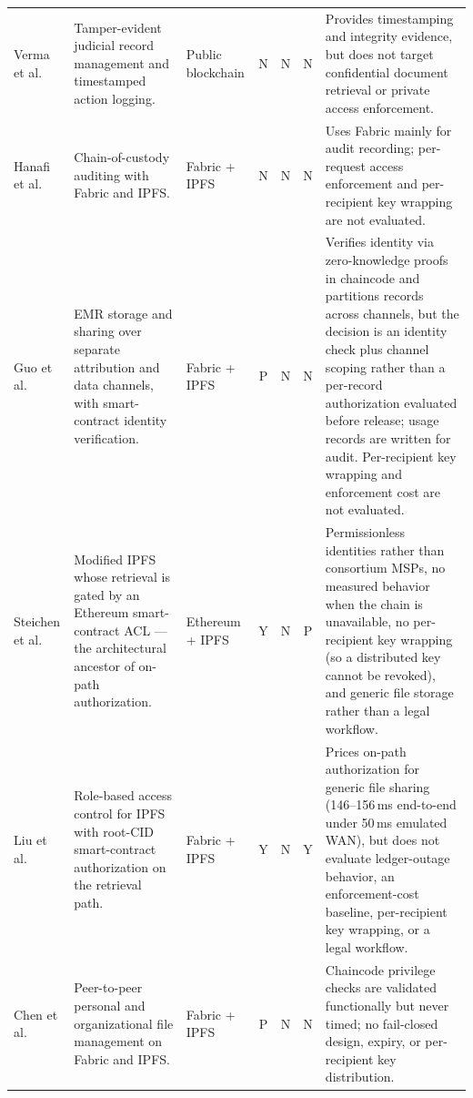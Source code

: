 \documentclass[preprint,12pt]{elsarticle}
\begin{document}
\begin{xltabular}{\textwidth}{@{}
>{\raggedright\arraybackslash}p{2.1cm}
>{\raggedright\arraybackslash}p{3.0cm}
>{\raggedright\arraybackslash}p{1.9cm}
c c c
>{\raggedright\arraybackslash}X
@{}}
Verma et al.~\cite{verma2021nyaya} &
Tamper-evident judicial record management and timestamped action logging. &
Public blockchain &
N & N & N &
Provides timestamping and integrity evidence, but does not target confidential document retrieval or private access enforcement. \\

Hanafi et al.~\cite{hanafi2021ipfschain} &
Chain-of-custody auditing with Fabric and IPFS. &
Fabric + IPFS &
N & N & N &
Uses Fabric mainly for audit recording; per-request access enforcement and per-recipient key wrapping are not evaluated. \\

Guo et al.~\cite{guo2024efficient} &
EMR storage and sharing over separate attribution and data channels, with smart-contract identity verification. &
Fabric + IPFS &
P & N & N &
Verifies identity via zero-knowledge proofs in chaincode and partitions records across channels, but the decision is an identity check plus channel scoping rather than a per-record authorization evaluated before release; usage records are written for audit. Per-recipient key wrapping and enforcement cost are not evaluated. \\

Steichen et al.~\cite{steichen2018blockchain} &
Modified IPFS whose retrieval is gated by an Ethereum smart-contract ACL --- the architectural ancestor of on-path authorization. &
Ethereum + IPFS &
Y & N & P &
Permissionless identities rather than consortium MSPs, no measured behavior when the chain is unavailable, no per-recipient key wrapping (so a distributed key cannot be revoked), and generic file storage rather than a legal workflow. \\

Liu et al.~\cite{liu2026rbacipfs} &
Role-based access control for IPFS with root-CID smart-contract authorization on the retrieval path. &
Fabric + IPFS &
Y & N & Y &
Prices on-path authorization for generic file sharing (146--156\,ms end-to-end under 50\,ms emulated WAN), but does not evaluate ledger-outage behavior, an enforcement-cost baseline, per-recipient key wrapping, or a legal workflow. \\

Chen et al.~\cite{chen2022filewallet} &
Peer-to-peer personal and organizational file management on Fabric and IPFS. &
Fabric + IPFS &
P & N & N &
Chaincode privilege checks are validated functionally but never timed; no fail-closed design, expiry, or per-recipient key distribution. \\


\end{xltabular}
\end{document}
